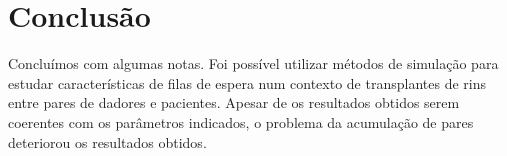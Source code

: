 \documentclass[10pt,a4paper,oneside]{article}
\begin{document}
\section*{Conclusão}

Concluímos com algumas notas. Foi possível utilizar métodos de
simulação para estudar características de filas de espera num contexto
de transplantes de rins entre pares de dadores e pacientes. Apesar de
os resultados obtidos serem coerentes com os parâmetros indicados, o
problema da acumulação de pares deteriorou os resultados obtidos.
\end{document}
